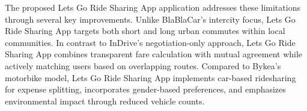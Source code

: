 The proposed Lets Go Ride Sharing App application addresses these limitations through several key improvements. Unlike BlaBlaCar's intercity focus, Lets Go Ride Sharing App targets both short and long urban commutes within local communities. In contrast to InDrive's negotiation-only approach, Lets Go Ride Sharing App combines transparent fare calculation with mutual agreement while actively matching users based on overlapping routes. Compared to Bykea's motorbike model, Lets Go Ride Sharing App implements car-based ridesharing for expense splitting, incorporates gender-based preferences, and emphasizes environmental impact through reduced vehicle counts.

\begin{table}[htbp]
\centering
\caption{Comparative Analysis of Existing Systems}
\renewcommand{\arraystretch}{1.3}


\end{table}
